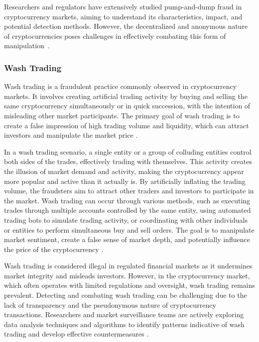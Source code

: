 Researchers and regulators have extensively studied pump-and-dump fraud in cryptocurrency markets, aiming to understand its characteristics, impact, and
potential detection methods. However, the decentralized and anonymous nature of cryptocurrencies poses challenges in effectively combating this form of
manipulation~\cite{jin2020pump, yang2019pump}.

\subsubsection{Wash Trading}
Wash trading is a fraudulent practice commonly observed in cryptocurrency markets. It involves creating artificial trading activity by buying and selling
the same cryptocurrency simultaneously or in quick succession, with the intention of misleading other market participants. The primary goal of wash trading
is to create a false impression of high trading volume and liquidity, which can attract investors and manipulate the market price \cite{gandal2018price}.

In a wash trading scenario, a single entity or a group of colluding entities control both sides of the trades, effectively trading with themselves. This
activity creates the illusion of market demand and activity, making the cryptocurrency appear more popular and active than it actually is. By artificially
inflating the trading volume, the fraudsters aim to attract other traders and investors to participate in the market. Wash trading can occur through various methods, such as executing trades through multiple accounts controlled by the same entity, using automated trading
bots to simulate trading activity, or coordinating with other individuals or entities to perform simultaneous buy and sell orders. The goal is to
manipulate market sentiment, create a false sense of market depth, and potentially influence the price of the cryptocurrency \cite{edelman2018detecting}.

Wash trading is considered illegal in regulated financial markets as it undermines market integrity and misleads investors. However, in the cryptocurrency
market, which often operates with limited regulations and oversight, wash trading remains prevalent. Detecting and combating wash trading can be challenging due to the lack of transparency and the pseudonymous nature of cryptocurrency transactions.
Researchers and market surveillance teams are actively exploring data analysis techniques and algorithms to identify patterns indicative of wash trading
and develop effective countermeasures \cite{gandal2018price, edelman2018detecting}.

